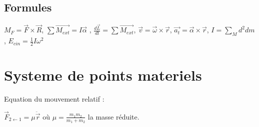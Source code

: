 \documentclass[10pt,a4paper]{article}
\begin{document}
\subsection{Formules}
$M_F = \vec F \times \vec R$,
$\sum \vec{M_{ext}} = I\vec{\alpha}$ ,
$\frac{d\vec{L}}{dt} = \sum \vec{M_{ext}}$,
$\vec{v} = \vec{\omega} \times \vec{r}$,
$\vec{a_t} = \vec{\alpha} \times \vec{r}$,
$I = \sum \limits_M d^2 dm$,
$E_{cin} = \frac{1}{2}I\omega^2$

\section{Systeme de points materiels}

Equation du mouvement relatif :

\begin{center}
$\vec{F}_{2 \leftarrow 1} = \mu \ddot\vec{r}$ où $\mu = \frac{m_1 m_2}{m_1 + m_2}$ la masse réduite.
\end{center}
\end{document}
